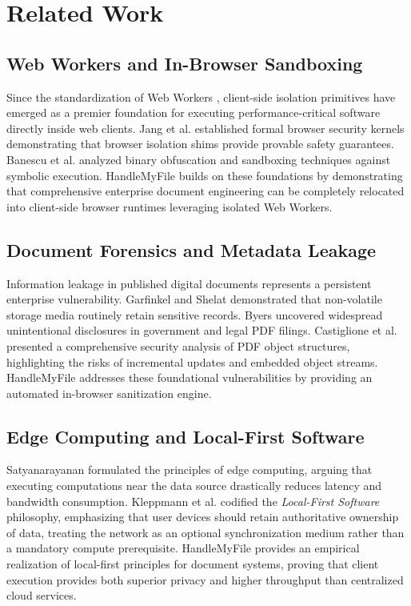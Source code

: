 \documentclass[journal]{IEEEtran}
\begin{document}
\section{Related Work}

\subsection{Web Workers and In-Browser Sandboxing}
Since the standardization of Web Workers \cite{whatwg2024workers}, client-side isolation primitives have emerged as a premier foundation for executing performance-critical software directly inside web clients. Jang et al. \cite{jang2012quark} established formal browser security kernels demonstrating that browser isolation shims provide provable safety guarantees. Banescu et al. \cite{banescu2016code} analyzed binary obfuscation and sandboxing techniques against symbolic execution. HandleMyFile builds on these foundations by demonstrating that comprehensive enterprise document engineering can be completely relocated into client-side browser runtimes leveraging isolated Web Workers.

\subsection{Document Forensics and Metadata Leakage}
Information leakage in published digital documents represents a persistent enterprise vulnerability. Garfinkel and Shelat \cite{garfinkel2003remembrance} demonstrated that non-volatile storage media routinely retain sensitive records. Byers \cite{byers2004information} uncovered widespread unintentional disclosures in government and legal PDF filings. Castiglione et al. \cite{castiglione2010security} presented a comprehensive security analysis of PDF object structures, highlighting the risks of incremental updates and embedded object streams. HandleMyFile addresses these foundational vulnerabilities by providing an automated in-browser sanitization engine.

\subsection{Edge Computing and Local-First Software}
Satyanarayanan \cite{satyanarayanan2017emergence} formulated the principles of edge computing, arguing that executing computations near the data source drastically reduces latency and bandwidth consumption. Kleppmann et al. \cite{kleppmann2019local} codified the \textit{Local-First Software} philosophy, emphasizing that user devices should retain authoritative ownership of data, treating the network as an optional synchronization medium rather than a mandatory compute prerequisite. HandleMyFile provides an empirical realization of local-first principles for document systems, proving that client execution provides both superior privacy and higher throughput than centralized cloud services.
\end{document}
